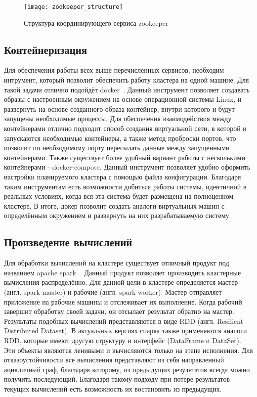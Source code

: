 \begin{figure}
    \centering
    \texttt{[image: zookeeper\_structure]}
    \caption{Структура координирующего сервиса zookeeper}
    \label{pic:lit_review:zookeeper_structure}
\end{figure}

\subsection{Контейнеризация}

Для обеспечения работы всех выше перечисленных сервисов, необходим интрумент, который позволит обеспечить работу кластера на одной машине.
Для такой задачи отлично подойдёт docker~\cite{docker_documentation_intro}.
Данный инструмент позволяет создавать образы с настроенным окружением на основе операционной системы Linux, и развернуть на основе созданного образа контейнер, внутри которого и будут запущены необходимые процессы.
Для обеспечения взаимодействия между контейнерами отлично подходит способ создания виртуальной сети, в которой и запускаются необходимые контейнеры, а также метод проброски портов, что позволит по необходимому порту пересылать данные между запущенными контейнерами.
Также существует более удобный вариант работы с несколькими контейнерами - docker-compose.
Данный инструмент позволяет удобно оформить настройки планируемого кластера с помощью файла конфигурации.
Благодаря таким инструментам есть возможности добиться работы системы, идентичной в реальных условиях, когда вся эта система будет размещена на полноценном кластере.
В итоге, докер позволит создать аналоги виртуальных машин с определённым окружением и развернуть на них разрабатываемую систему.

\subsection{Произведение вычислений}

Для обработки вычислений на кластере существует отличный продукт под названием apache spark ~\cite{spark_documentation_intro}
Данный продукт позволяет производить кластерные вычисления распределённо.
Для данной цели в кластере определяется мастер (англ. spark-master) и рабочие (англ. spark-worker).
Мастер отправляет приложение на рабочие машины и отслеживает их выполнение.
Когда рабочий завершит обработку своей задачи, он отсылает результат обратно на мастер.
Результаты подобных вычислений представляются в виде RDD (англ. Resilient Distributed Dataset). 
В актуальных версиях спарка также применяются аналоги RDD, которые имеют другую структуру и интерфейс (DataFrame и DataSet).
Эти объекты являются ленивыми и вычисляются только на этапе исполнения.
Для отказоустойчивости все вычисления представляют из себя направленный ацикличный граф, благодаря которому, из предыдущих результатов всегда можно получить последующий.
Благодаря такому подходу при потере результатов текущих вычислений есть возможность их востановить из предыдущих.


